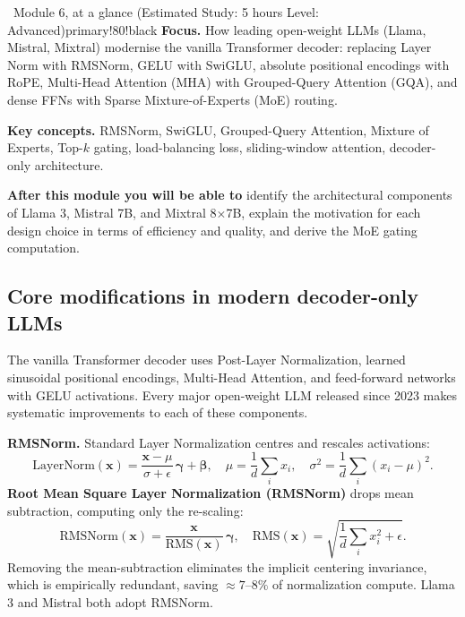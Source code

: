 \documentclass[11pt,a4paper]{article}
\begin{document}
	\begin{modulecard}{\faRobot\ Module 6, at a glance \hfill \small\normalfont (Estimated Study: 5 hours \textbullet{} Level: Advanced)}{primary!80!black}
		\textbf{Focus.} How leading open-weight LLMs (Llama, Mistral, Mixtral) modernise the vanilla Transformer decoder: replacing Layer Norm with RMSNorm, GELU with SwiGLU, absolute positional encodings with RoPE, Multi-Head Attention (MHA) with Grouped-Query Attention (GQA), and dense FFNs with Sparse Mixture-of-Experts (MoE) routing.

		\medskip
		\textbf{Key concepts.} RMSNorm, SwiGLU, Grouped-Query Attention, Mixture of Experts, Top-$k$ gating, load-balancing loss, sliding-window attention, decoder-only architecture.

		\medskip
		\textbf{After this module you will be able to} identify the architectural components of Llama 3, Mistral 7B, and Mixtral 8$\times$7B, explain the motivation for each design choice in terms of efficiency and quality, and derive the MoE gating computation.
	\end{modulecard}

	\subsection{Core modifications in modern decoder-only LLMs}

	The vanilla Transformer decoder \parencite{vaswani2017} uses Post-Layer Normalization, learned sinusoidal positional encodings, Multi-Head Attention, and feed-forward networks with GELU activations. Every major open-weight LLM released since 2023 makes systematic improvements to each of these components.

	\textbf{RMSNorm.} Standard Layer Normalization \parencite{vaswani2017} centres and rescales activations:
	\begin{equation}
		\mathrm{LayerNorm}(\mathbf{x}) = \frac{\mathbf{x} - \mu}{\sigma + \epsilon}\,\boldsymbol{\gamma} + \boldsymbol{\beta},
		\quad \mu = \frac{1}{d}\sum_i x_i,\quad \sigma^2 = \frac{1}{d}\sum_i (x_i-\mu)^2.
	\end{equation}
	\textbf{Root Mean Square Layer Normalization (RMSNorm)} \parencite{zhang2019rmsnorm} drops mean subtraction, computing only the re-scaling:
	\begin{equation}
		\mathrm{RMSNorm}(\mathbf{x}) = \frac{\mathbf{x}}{\mathrm{RMS}(\mathbf{x})}\,\boldsymbol{\gamma},
		\quad \mathrm{RMS}(\mathbf{x}) = \sqrt{\frac{1}{d}\sum_i x_i^2 + \epsilon}.
	\end{equation}
	Removing the mean-subtraction eliminates the implicit centering invariance, which is empirically redundant, saving $\approx 7$--$8\%$ of normalization compute. Llama 3 \parencite{dubey2024} and Mistral \parencite{jiang2023mistral} both adopt RMSNorm.
\end{document}
